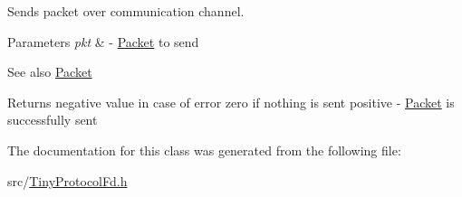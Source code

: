 Sends packet over communication channel. 
\begin{DoxyParams}{Parameters}
{\em pkt} & -\/ \hyperlink{classTiny_1_1Packet}{Packet} to send \\
\hline
\end{DoxyParams}
\begin{DoxySeeAlso}{See also}
\hyperlink{classTiny_1_1Packet}{Packet} 
\end{DoxySeeAlso}
\begin{DoxyReturn}{Returns}
negative value in case of error zero if nothing is sent positive -\/ \hyperlink{classTiny_1_1Packet}{Packet} is successfully sent 
\end{DoxyReturn}


The documentation for this class was generated from the following file\+:\begin{DoxyCompactItemize}
\item 
src/\hyperlink{TinyProtocolFd_8h}{Tiny\+Protocol\+Fd.\+h}\end{DoxyCompactItemize}
